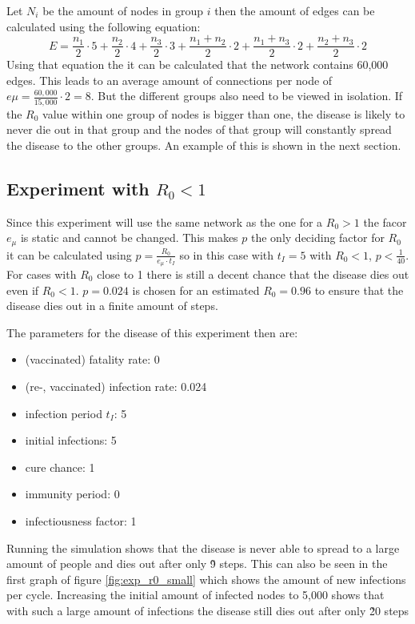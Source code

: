 Let $N_i$ be the amount of nodes in group $i$ then the amount of edges can be calculated using the following equation:
\begin{equation}
    E = \frac{n_1}{2} \cdot 5 + \frac{n_2}{2} \cdot 4 + \frac{n_3}{2} \cdot 3 + \frac{n_1+n_2}{2} \cdot 2 + \frac{n_1+n_3}{2} \cdot 2 + \frac{n_2+n_3}{2} \cdot 2
\end{equation}
Using that equation the it can be calculated that the network contains 60,000 edges. This leads to an average amount of connections per node of $e\mu=\frac{60,000}{15,000} \cdot 2 = 8$. But the different groups also need to be viewed in isolation. If the $R_0$ value within one group of nodes is bigger than one, the disease is likely to never die out in that group and the nodes of that group will constantly spread the disease to the other groups. An example of this is shown in the next section.

\subsection{Experiment with $R_0 < 1$}
Since this experiment will use the same network as the one for a $R_0 > 1$ the facor $e_\mu$ is static and cannot be changed. This makes $p$ the only deciding factor for $R_0$ it can be calculated using $p = \frac{R_0}{e_\mu \cdot t_I}$ so in this case with $t_I=5$ with $R_0 < 1$, $p < \frac{1}{40}$. For cases with $R_0$ close to 1 there is still a decent chance that the disease dies out even if $R_0 < 1$. $p=0.024$ is chosen for an estimated $R_0=0.96$ to ensure that the disease dies out in a finite amount of steps.

The parameters for the disease of this experiment then are:
\begin{itemize}
    \item (vaccinated) fatality rate: 0
    \item (re-, vaccinated) infection rate: 0.024
    \item infection period $t_I$: 5
    \item initial infections: 5
    \item cure chance: 1
    \item immunity period: 0
    \item infectiousness factor: 1
\end{itemize}

Running the simulation shows that the disease is never able to spread to a large amount of people and dies out after only \~9 steps. This can also be seen in the first graph of figure \ref{fig:exp_r0_small} which shows the amount of new infections per cycle. Increasing the initial amount of infected nodes to 5,000 shows that with such a large amount of infections the disease still dies out after only \~20 steps


